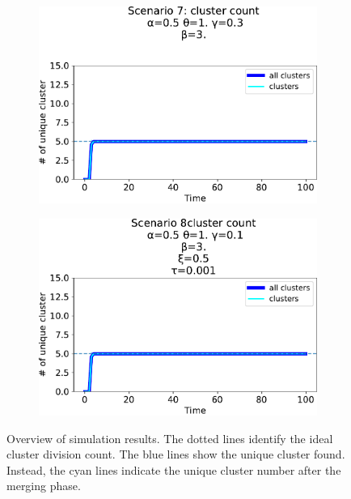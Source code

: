 \begin{figure}[t]
\begin{subfigure}[b]{0.32\textwidth}
    \includegraphics[width=\textwidth]{papers/swarm-intelligence2021/img/simulations/standard-updatable_0_021_α-0.5_θ-1._γ-0.3_β-3._ω-0._ζ-0..pdf}
  \end{subfigure}
  \begin{subfigure}[b]{0.32\textwidth}
    \centering
    \includegraphics[width=\textwidth]{papers/swarm-intelligence2021/img/simulations/failScenario_0_021_α-0.5_θ-1._γ-0.1_β-3._ω-0._ζ-0._ξ-0.5_τ-0.001}
  \end{subfigure}
  \caption{Overview of simulation results. 
  The dotted lines identify the ideal cluster division count. 
  The blue lines show the unique cluster found. 
  Instead, the cyan lines indicate the unique cluster number after the merging phase. 
  }
  \label{fig:overview-results}
\end{figure}